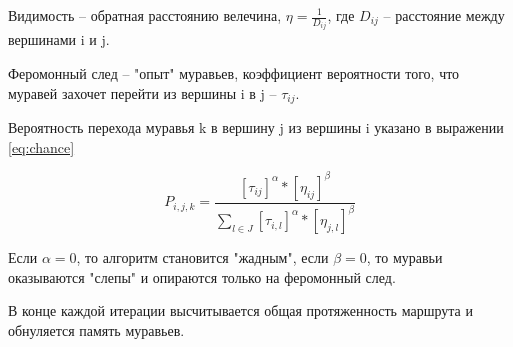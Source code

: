 Видимость -- обратная расстоянию велечина, $\eta = \frac{1}{D_{ij}}$, где $D_{ij}$ -- расстояние между вершинами i и j.

Феромонный след -- "опыт" муравьев, коэффициент вероятности того, что муравей захочет перейти из вершины i в j -- $\tau_{ij}$.

Вероятность перехода муравья k в вершину j из вершины i указано в выражении \ref{eq:chance}

\begin{equation}
P_{i, j, k} = \frac{[\tau_{ij}]^\alpha * [\eta_{ij}]^\beta}{\sum_{l \in J} [\tau_{i,l}]^\alpha * [\eta_{j,l}]^\beta}
\label{eq:chance}
\end{equation}

Если $\alpha = 0$, то алгоритм становится "жадным", если $\beta = 0$, то муравьи оказываются "слепы" и опираются только на феромонный след.

В конце каждой итерации высчитывается общая протяженность маршрута и обнуляется память муравьев.
